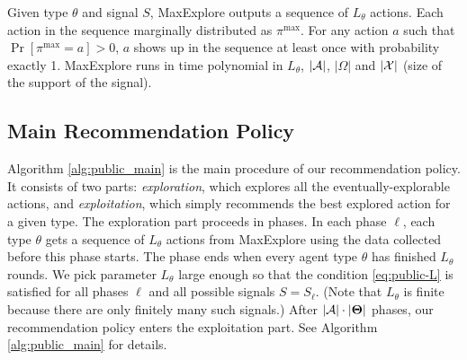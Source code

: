 \begin{claim}
\label{clm:maxexplore}
Given type $\theta$ and signal $S$, MaxExplore outputs a sequence of $L_{\theta}$ actions.
Each action in the sequence marginally distributed as $\pi^{\max}$.
For any action $a$ such that $\Pr[\pi^{\max} =a] >0$, $a$ shows up in the sequence at least once with probability exactly 1.
MaxExplore runs in time polynomial in $L_{\theta}$, $|\mathcal{A}|$, $|\varOmega|$ and $|\mathcal{X}|$ (size of the support of the signal).
\end{claim}


\subsection{Main Recommendation Policy}
\label{sec:public_main}

Algorithm \ref{alg:public_main} is the main procedure of our recommendation policy. It consists of two parts: \emph{exploration}, which explores all the eventually-explorable actions, and \emph{exploitation}, which simply recommends the best explored action for a given type. The exploration part proceeds in phases. In each phase $\ell$, each type $\theta$ gets a sequence of $L_{\theta}$ actions from MaxExplore using the data collected before this phase starts. The phase ends when every agent type $\theta$ has finished $L_{\theta}$ rounds. We pick parameter $L_{\theta}$ large enough so that the condition
\eqref{eq:public-L} is satisfied for all phases $\ell$ and all possible signals $S=S_\ell$. (Note that $L_{\theta}$ is finite because there are only finitely many such signals.)
  After $|\mathcal{A}| \cdot | \bold{\Theta}|$ phases, our recommendation policy enters the exploitation part. See Algorithm \ref{alg:public_main} for  details.

